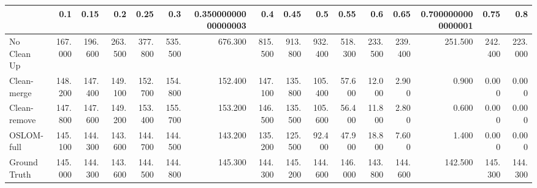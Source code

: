 \begin{tabular}{lrrrrrrrrrrrrrrr}
\toprule
{} &     0.1 &    0.15 &     0.2 &    0.25 &     0.3 & 0.35000000000000003 &     0.4 &    0.45 &     0.5 &    0.55 &     0.6 &    0.65 & 0.7000000000000001 &    0.75 &     0.8 \\
\midrule
No Clean Up  & 167.000 & 196.600 & 263.500 & 377.800 & 535.500 &             676.300 & 815.500 & 913.800 & 932.400 & 518.300 & 233.500 & 239.400 &            251.500 & 242.400 & 223.000 \\
Clean-merge  & 148.200 & 147.400 & 149.100 & 152.700 & 154.800 &             152.400 & 147.100 & 135.800 & 105.400 &  57.600 &  12.000 &   2.900 &              0.900 &   0.000 &   0.000 \\
Clean-remove & 147.800 & 147.600 & 149.200 & 153.400 & 155.700 &             153.200 & 146.500 & 135.500 & 105.600 &  56.400 &  11.800 &   2.800 &              0.600 &   0.000 &   0.000 \\
OSLOM-full   & 145.100 & 144.300 & 143.600 & 144.700 & 144.500 &             143.200 & 135.200 & 125.500 &  92.400 &  47.900 &  18.800 &   7.600 &              1.400 &   0.000 &   0.000 \\
Ground Truth & 145.000 & 144.300 & 143.600 & 144.500 & 144.800 &             145.300 & 144.300 & 145.200 & 144.600 & 146.000 & 143.800 & 144.600 &            142.500 & 145.300 & 144.300 \\
\bottomrule
\end{tabular}
